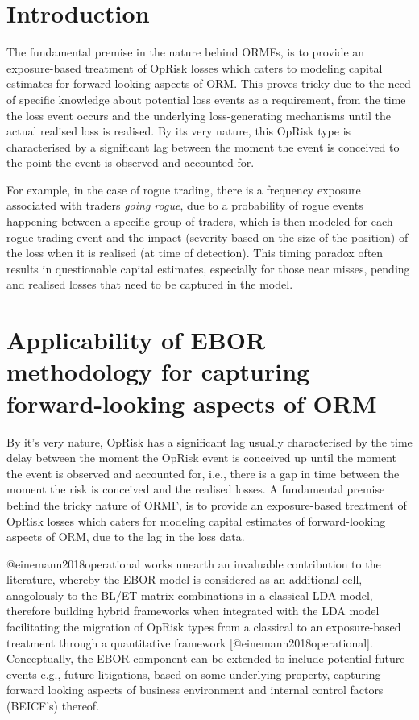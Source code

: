 \documentclass[]{article}
\title{}
\author{}
\date{}
\begin{document}
\doublespacing

\section{Introduction}
\label{sec3:Introduction}

The fundamental premise in the nature behind ORMFs, is to provide an
exposure-based treatment of OpRisk losses which caters to modeling
capital estimates for forward-looking aspects of ORM. This proves tricky
due to the need of specific knowledge about potential loss events as a
requirement, from the time the loss event occurs and the underlying
loss-generating mechanisms until the actual realised loss is realised.
By its very nature, this OpRisk type is characterised by a significant
lag between the moment the event is conceived to the point the event is
observed and accounted for.\medskip 

For example, in the case of rogue trading, there is a frequency exposure
associated with traders \emph{going rogue}, due to a probability of
rogue events happening between a specific group of traders, which is
then modeled for each rogue trading event and the impact (severity based
on the size of the position) of the loss when it is realised (at time of
detection). This timing paradox often results in questionable capital
estimates, especially for those near misses, pending and realised losses
that need to be captured in the model.

\section{Applicability of EBOR methodology for capturing forward-looking aspects of ORM}
\label{sec:Applicability of EBOR methodology for capturing forward-looking aspects of ORM}

By it's very nature, OpRisk has a significant lag usually characterised
by the time delay between the moment the OpRisk event is conceived up
until the moment the event is observed and accounted for, i.e., there is
a gap in time between the moment the risk is conceived and the realised
losses. A fundamental premise behind the tricky nature of ORMF, is to
provide an exposure-based treatment of OpRisk losses which caters for
modeling capital estimates of forward-looking aspects of ORM, due to the
lag in the loss data.\medskip

@einemann2018operational works unearth an invaluable contribution to the
literature, whereby the EBOR model is considered as an additional cell,
anagolously to the BL/ET matrix combinations in a classical LDA model,
therefore building hybrid frameworks when integrated with the LDA model
facilitating the migration of OpRisk types from a classical to an
exposure-based treatment through a quantitative framework
{[}@einemann2018operational{]}. Conceptually, the EBOR component can be
extended to include potential future events e.g., future litigations,
based on some underlying property, capturing forward looking aspects of
business environment and internal control factors (BEICF's)
thereof.\medskip
\end{document}
